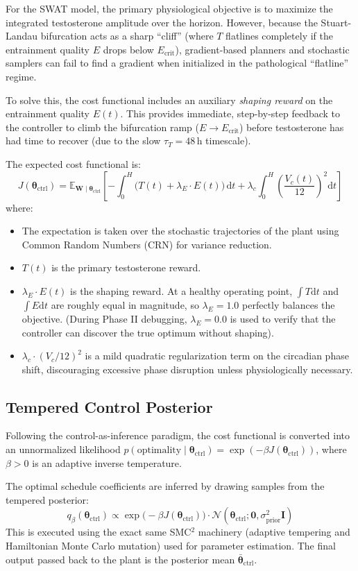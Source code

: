 \documentclass[11pt,a4paper]{article}
\begin{document}
For the SWAT model, the primary physiological objective is to maximize the integrated testosterone amplitude over the horizon. However, because the Stuart-Landau bifurcation acts as a sharp ``cliff'' (where $T$ flatlines completely if the entrainment quality $E$ drops below $E_{\text{crit}}$), gradient-based planners and stochastic samplers can fail to find a gradient when initialized in the pathological ``flatline'' regime.

To solve this, the cost functional includes an auxiliary \textit{shaping reward} on the entrainment quality $E(t)$. This provides immediate, step-by-step feedback to the controller to climb the bifurcation ramp ($E \to E_{\text{crit}}$) before testosterone has had time to recover (due to the slow $\tau_T = 48$\,h timescale). 

The expected cost functional is:
\[
J(\boldsymbol{\theta}_{\text{ctrl}}) = \mathbb{E}_{\mathbf{W} \mid \boldsymbol{\theta}_{\text{ctrl}}} \left[ - \int_0^H \Big( T(t) + \lambda_E \cdot E(t) \Big) \, \mathrm{d}t  + \lambda_c \int_0^H \left(\frac{V_c(t)}{12}\right)^2 \mathrm{d}t \right]
\]
where:
\begin{itemize}
    \item The expectation is taken over the stochastic trajectories of the plant using Common Random Numbers (CRN) for variance reduction.
    \item $T(t)$ is the primary testosterone reward.
    \item $\lambda_E \cdot E(t)$ is the shaping reward. At a healthy operating point, $\int T \mathrm{d}t$ and $\int E \mathrm{d}t$ are roughly equal in magnitude, so $\lambda_E = 1.0$ perfectly balances the objective. (During Phase II debugging, $\lambda_E = 0.0$ is used to verify that the controller can discover the true optimum without shaping).
    \item $\lambda_c \cdot (V_c/12)^2$ is a mild quadratic regularization term on the circadian phase shift, discouraging excessive phase disruption unless physiologically necessary.
\end{itemize}

\subsection{Tempered Control Posterior}

Following the control-as-inference paradigm, the cost functional is converted into an unnormalized likelihood $p(\text{optimality} \mid \boldsymbol{\theta}_{\text{ctrl}}) = \exp(-\beta J(\boldsymbol{\theta}_{\text{ctrl}}))$, where $\beta > 0$ is an adaptive inverse temperature. 

The optimal schedule coefficients are inferred by drawing samples from the tempered posterior:
\[
q_\beta(\boldsymbol{\theta}_{\text{ctrl}}) \propto \exp\big(-\beta J(\boldsymbol{\theta}_{\text{ctrl}})\big) \cdot \mathcal{N}(\boldsymbol{\theta}_{\text{ctrl}}; \mathbf{0}, \sigma_{\text{prior}}^2 \mathbf{I})
\]
This is executed using the exact same SMC$^2$ machinery (adaptive tempering and Hamiltonian Monte Carlo mutation) used for parameter estimation. The final output passed back to the plant is the posterior mean $\bar{\boldsymbol{\theta}}_{\text{ctrl}}$.
\end{document}
